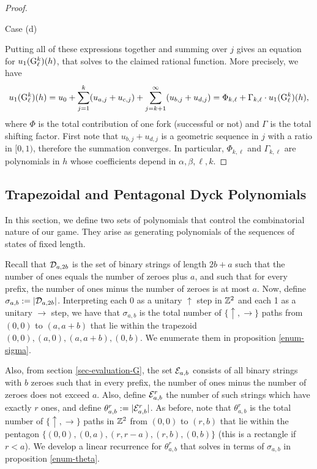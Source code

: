 \begin{proof}
\begin{subsubsection}{Case (d)}
\end{subsubsection}

Putting all of these expressions together and summing over $j$ gives an equation for $u_1({\rm {G}}^k_\ell)(h)$, that solves to the claimed rational function. More precisely, we have
$$u_1({\rm {G}}^k_\ell)(h) = u_0 + \sum_{j=1}^k (u_{a,j} + u_{c,j}) + \sum_{j=k+1}^\infty (u_{b,j} + u_{d,j}) = \Phi_{k,\ell} + \Gamma_{k,\ell}\cdot u_1({\rm {G}}^k_\ell)(h),$$
where $\Phi$ is the total contribution of one fork (successful or not) and $\Gamma$ is the total shifting factor. First note that $u_{b,j}+u_{d,j}$ is a geometric sequence in $j$ with a ratio in $[0,1)$, therefore the summation converges. In particular, $\Phi_{k,\ell}$ and $\Gamma_{k,\ell}$ are polynomials in $h$ whose coefficients depend in $\alpha,\beta,\ell,k$.
\end{proof}

\subsection{Trapezoidal and Pentagonal Dyck Polynomials}
\label{sec-trapezoid-pentagon}

In this section, we define two sets of polynomials that control the combinatorial nature of our game. They arise as generating polynomials of the sequences of states of fixed length. 

Recall that $\mathcal{D}_{a,2b}$ is the set of binary strings of length $2b+a$ such that the number of ones equals the number of zeroes plus $a$, and such that for every prefix, the number of ones minus the number of zeroes is at most $a$. Now, define $\sigma_{a,b}:=|\mathcal{D}_{a,2b}|$. Interpreting each 0 as a unitary $\uparrow$ step in $\mathbb{Z}^2$ and each 1 as a unitary $\rightarrow$ step, we have that $\sigma_{a,b}$ is the total number of $\{\uparrow,\rightarrow\}$ paths from $(0,0)$ to $(a,a+b)$ that lie within the trapezoid ${(0,0),(a,0),(a,a+b),(0,b)}$. We enumerate them in proposition \ref{enum-sigma}.

Also, from section \ref{sec-evaluation-G}, the set $\mathcal{E}_{a,b}$ consists of all binary strings with $b$ zeroes such that in every prefix, the number of ones minus the number of zeroes does not exceed $a$. Also, define $\mathcal{E}_{a,b}^r$ the number of such strings which have exactly $r$ ones, and define $\theta_{a,b}^r:= |\mathcal{E}_{a,b}^r|$. As before, note that $\theta_{a,b}^r$ is the total number of $\{\uparrow,\rightarrow\}$ paths in $\mathbb{Z}^2$ from $(0,0)$ to $(r,b)$ that lie within the pentagon $\{(0,0),(0,a),(r,r-a), (r,b), (0,b)\}$ (this is a rectangle if $r<a$). We develop a linear recurrence for $\theta_{a,b}^r$ that solves in terms of $\sigma_{a,b}$ in proposition \ref{enum-theta}.
